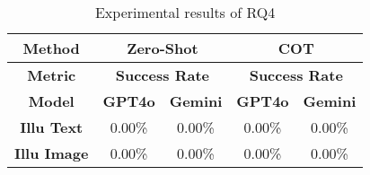 
\begin{table}[t!]
    \centering
    \tabcolsep=1.5pt
    \renewcommand{\arraystretch}{0.92} 
    \caption{Experimental results of RQ4}
    \begin{tabular}{c|cc|cc}
    \hline
    \textbf{Method}             & \multicolumn{2}{c|}{\textbf{Zero-Shot}}                                  & \multicolumn{2}{c}{\textbf{COT}}                               \\ \hline
    \textbf{Metric}             & \multicolumn{2}{c|}{\textbf{Success Rate}}                               & \multicolumn{2}{c}{\textbf{Success Rate}}                                \\ \hline
    \textbf{Model}              & \multicolumn{1}{c|}{\textbf{GPT4o}} & \textbf{Gemini} & \multicolumn{1}{c|}{\textbf{GPT4o}} & \textbf{Gemini} \\ \hline
    \textbf{Illu Text} & 0.00\%                                 & 0.00\%    &0.00\%                                 & 0.00\%                  \\ \hline
    \textbf{Illu Image} & 0.00\%                                 & 0.00\%    &0.00\%                                & 0.00\%                 \\ \hline
    \end{tabular}
    \label{tex:RQ2}
\end{table}